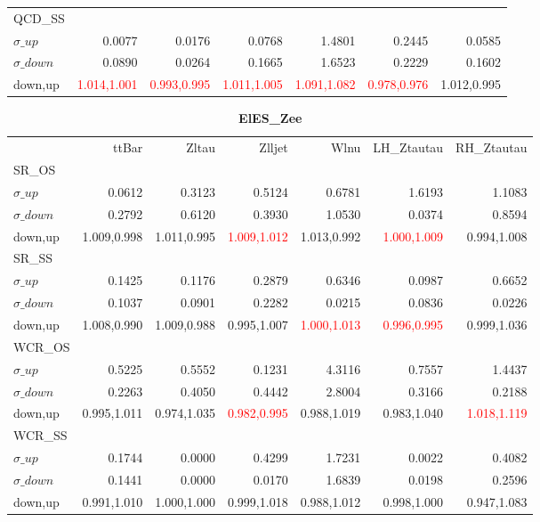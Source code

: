 \documentclass[11pt,oneside,a4paper]{article}
\begin{document}
\begin{table}
\begin{tabular}{lrrrrrr}
\hline
QCD\_SS &  &  &  &  &  &  \\
$\sigma\_up$ & 0.0077 & 0.0176 & 0.0768 & 1.4801 & 0.2445 & 0.0585 \\
$\sigma\_down$ & 0.0890 & 0.0264 & 0.1665 & 1.6523 & 0.2229 & 0.1602 \\
down,up & \textcolor{red}{1.014,1.001} & \textcolor{red}{0.993,0.995} & \textcolor{red}{1.011,1.005} & \textcolor{red}{1.091,1.082} & \textcolor{red}{0.978,0.976} & 1.012,0.995 \\

\hline
\end{tabular}
\end{table}
\begin{table}
\centering
\caption{\bf{ElES\_Zee}}
\begin{tabular}{lrrrrrr}
 & ttBar & Zltau & Zlljet & Wlnu & LH\_Ztautau & RH\_Ztautau \\
SR\_OS &  &  &  &  &  &  \\
$\sigma\_up$ & 0.0612 & 0.3123 & 0.5124 & 0.6781 & 1.6193 & 1.1083 \\
$\sigma\_down$ & 0.2792 & 0.6120 & 0.3930 & 1.0530 & 0.0374 & 0.8594 \\
down,up & 1.009,0.998 & 1.011,0.995 & \textcolor{red}{1.009,1.012} & 1.013,0.992 & \textcolor{red}{1.000,1.009} & 0.994,1.008 \\

\hline
SR\_SS &  &  &  &  &  &  \\
$\sigma\_up$ & 0.1425 & 0.1176 & 0.2879 & 0.6346 & 0.0987 & 0.6652 \\
$\sigma\_down$ & 0.1037 & 0.0901 & 0.2282 & 0.0215 & 0.0836 & 0.0226 \\
down,up & 1.008,0.990 & 1.009,0.988 & 0.995,1.007 & \textcolor{red}{1.000,1.013} & \textcolor{red}{0.996,0.995} & 0.999,1.036 \\

\hline
WCR\_OS &  &  &  &  &  &  \\
$\sigma\_up$ & 0.5225 & 0.5552 & 0.1231 & 4.3116 & 0.7557 & 1.4437 \\
$\sigma\_down$ & 0.2263 & 0.4050 & 0.4442 & 2.8004 & 0.3166 & 0.2188 \\
down,up & 0.995,1.011 & 0.974,1.035 & \textcolor{red}{0.982,0.995} & 0.988,1.019 & 0.983,1.040 & \textcolor{red}{1.018,1.119} \\

\hline
WCR\_SS &  &  &  &  &  &  \\
$\sigma\_up$ & 0.1744 & 0.0000 & 0.4299 & 1.7231 & 0.0022 & 0.4082 \\
$\sigma\_down$ & 0.1441 & 0.0000 & 0.0170 & 1.6839 & 0.0198 & 0.2596 \\
down,up & 0.991,1.010 & 1.000,1.000 & 0.999,1.018 & 0.988,1.012 & 0.998,1.000 & 0.947,1.083 \\


\end{tabular}
\end{table}
\end{document}
